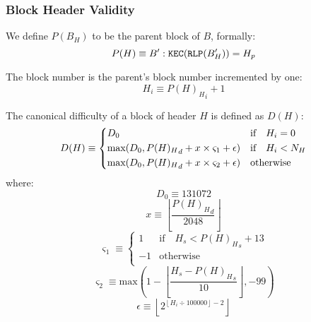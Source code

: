 \documentclass[9pt,oneside]{amsart}
\newcommand{\firsthomesteadblock}{\ensuremath{N_H}}
\begin{document}
\begin{multicols}{2}
\subsubsection{Block Header Validity}

We define $P(B_H)$ to be the parent block of $B$, formally:
\begin{equation}
P(H) \equiv B': \mathtt{\tiny KEC}(\mathtt{\tiny RLP}(B'_H)) = H_p
\end{equation}

The block number is the parent's block number incremented by one:
\begin{equation}
H_i \equiv {{P(H)_H}_i} + 1
\end{equation}

\newcommand{\mindifficulty}{D_0}
\newcommand{\frontiermod}{\ensuremath{\varsigma_1}}
\newcommand{\homesteadmod}{\ensuremath{\varsigma_2}}
\newcommand{\expdiffsymb}{\ensuremath{\epsilon}}
\newcommand{\diffadjustment}{x}

The canonical difficulty of a block of header $H$ is defined as $D(H)$:
\begin{equation}
D(H) \equiv \begin{dcases}
\mindifficulty & \text{if} \quad H_i = 0\\
\text{max}\!\left(\mindifficulty, {P(H)_H}_d + \diffadjustment\times\frontiermod + \expdiffsymb \right) & \text{if} \quad H_i<\firsthomesteadblock\\
\text{max}\!\left(\mindifficulty, {P(H)_H}_d + \diffadjustment\times\homesteadmod + \expdiffsymb \right) & \text{otherwise}\\
\end{dcases}
\end{equation}
where:
\begin{equation}
\mindifficulty \equiv 131072
\end{equation}
\begin{equation}
\diffadjustment \equiv \left\lfloor\frac{{P(H)_H}_d}{2048}\right\rfloor
\end{equation}
\begin{equation}
\frontiermod \equiv \begin{cases}
1 & \text{if} \quad H_s < {P(H)_H}_s + 13 \\
-1 & \text{otherwise} \\
\end{cases}
\end{equation}
\begin{equation}
\homesteadmod \equiv \text{max}\left( 1 - \left\lfloor\frac{H_s - {P(H)_H}_s}{10}\right\rfloor, -99 \right)
\end{equation}
\begin{equation}
\expdiffsymb \equiv \left\lfloor 2^{ \left\lfloor H_i \div 100000 \right\rfloor - 2 } \right\rfloor
\end{equation}


\end{multicols}
\end{document}
